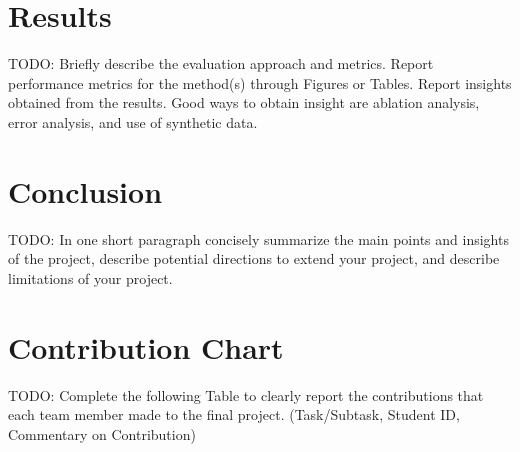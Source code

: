 \documentclass{article}
\theoremstyle{plain}
\theoremstyle{definition}
\theoremstyle{remark}
\begin{document}
\section{Results}
TODO: Briefly describe the evaluation approach and metrics. Report performance metrics for the method(s) through Figures or Tables.
Report insights obtained from the results. Good ways to obtain insight are ablation analysis, error
analysis, and use of synthetic data.

\section{Conclusion}
TODO: In one short paragraph concisely summarize the main points and insights of the project,
describe potential directions to extend your project, and describe limitations of your project.

\section{Contribution Chart}
TODO: Complete the following Table to clearly report the contributions that each team
member made to the final project. (Task/Subtask, Student ID, Commentary on Contribution)


\end{document}
